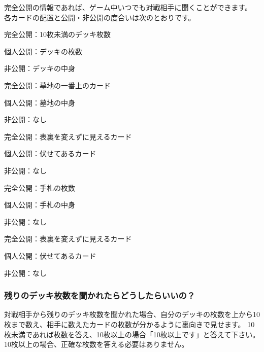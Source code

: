 \documentclass[letterpaper,10pt,dvipdfmx]{sphinxmanual}
\begin{document}
\sphinxAtStartPar
完全公開の情報であれば、ゲーム中いつでも対戦相手に聞くことができます。
各カードの配置と公開・非公開の度合いは次のとおりです。
\begin{description}
\begin{DUlineblock}{0em}
\item[] 完全公開：10枚未満のデッキ枚数
\item[] 個人公開：デッキの枚数
\item[] 非公開：デッキの中身
\end{DUlineblock}

\begin{DUlineblock}{0em}
\item[] 完全公開：墓地の一番上のカード
\item[] 個人公開：墓地の中身
\item[] 非公開：なし
\end{DUlineblock}

\begin{DUlineblock}{0em}
\item[] 完全公開：表裏を変えずに見えるカード
\item[] 個人公開：伏せてあるカード
\item[] 非公開：なし
\end{DUlineblock}

\begin{DUlineblock}{0em}
\item[] 完全公開：手札の枚数
\item[] 個人公開：手札の中身
\item[] 非公開：なし
\end{DUlineblock}

\begin{DUlineblock}{0em}
\item[] 完全公開：表裏を変えずに見えるカード
\item[] 個人公開：伏せてあるカード
\item[] 非公開：なし
\end{DUlineblock}

\end{description}


\subsubsection{残りのデッキ枚数を聞かれたらどうしたらいいの？}
\label{\detokenize{common/common:id45}}
\sphinxAtStartPar
対戦相手から残りのデッキ枚数を聞かれた場合、自分のデッキの枚数を上から10枚まで数え、相手に数えたカードの枚数が分かるように裏向きで見せます。
10枚未満であれば枚数を答え、10枚以上の場合「10枚以上です」と答えて下さい。
10枚以上の場合、正確な枚数を答える必要はありません。
\end{document}
